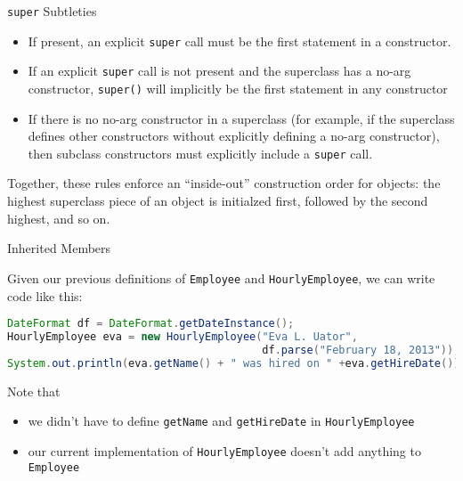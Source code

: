 \documentclass{beamer}
\begin{document}
\begin{frame}[fragile]{{\tt super} Subtleties}


\begin{itemize}
\item If present, an explicit {\tt super} call must be the first statement in a constructor.
\item If an explicit {\tt super} call is not present and the superclass has a no-arg constructor, {\tt super()} will implicitly be the first statement in any constructor
\item If there is no no-arg constructor in a superclass (for example, if the superclass defines other constructors without explicitly defining a no-arg constructor), then subclass constructors must explicitly include a {\tt super} call.
\end{itemize}
Together, these rules enforce an ``inside-out'' construction order for objects: the highest superclass piece of an object is initialzed first, followed by the second highest, and so on.

\end{frame}

\begin{frame}[fragile]{Inherited Members}


Given our previous definitions of {\tt Employee} and {\tt HourlyEmployee}, we can write code like this:
\begin{lstlisting}[language=Java]
DateFormat df = DateFormat.getDateInstance();
HourlyEmployee eva = new HourlyEmployee("Eva L. Uator",
                                        df.parse("February 18, 2013"));
System.out.println(eva.getName() + " was hired on " +eva.getHireDate());
\end{lstlisting}
Note that
\begin{itemize}
\item we didn't have to define {\tt getName} and {\tt getHireDate} in {\tt HourlyEmployee}
\item our current implementation of {\tt HourlyEmployee} doesn't add anything to {\tt Employee}
\end{itemize}


\end{frame}
\end{document}

